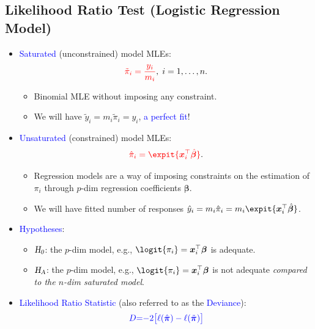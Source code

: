 \documentclass{article}\usepackage[]{graphicx}\usepackage[svgnames]{xcolor}
\newcommand{\HN}{\textsl{H}_{\textsl{0}}}%
\newcommand{\HA}{\textsl{H}_{\textsl{A}}}%
\providecommand{\Vector}[1]{\bm{#1}}%
\begin{document}
\subsection*{Likelihood Ratio Test (Logistic Regression Model)}
\begin{itemize}
      \item \textcolor{Blue}{Saturated} (unconstrained) model MLEs:
            \[ \textcolor{Red}{\tilde{\pi}_i=\frac{y_i}{m_i}},\; i=1,\ldots,n. \]
            \begin{itemize}
                  \item Binomial MLE without imposing any constraint.
                  \item We will have $ \tilde{y}_i=m_i\tilde{\pi}_i=y_i $, \textcolor{Blue}{a perfect fit}!
            \end{itemize}
      \item \textcolor{Blue}{Unsaturated} (constrained) model MLEs:
            \[ \textcolor{Red}{\hat{\pi}_i=\expit{\Vector{x}_i^\top \hat{\Vector{\beta}}}}. \]
            \begin{itemize}
                  \item Regression models are a way of imposing constraints on the estimation of $ \pi_i $ through $ p $-dim regression coefficients $ \Vector{\beta} $.
                  \item We will have fitted number of responses $ \hat{y}_i=m_i\hat{\pi}_i=m_i\expit{\Vector{x}_i^\top \hat{\Vector{\beta}}} $.
            \end{itemize}
      \item \textcolor{Blue}{Hypotheses}:
            \begin{itemize}
                  \item $ \HN $: the $ p $-dim model, e.g., $ \logit{\pi_i}=\Vector{x}_i^\top \Vector{\beta} $ is adequate.
                  \item $ \HA $: the $ p $-dim model, e.g., $ \logit{\pi_i}=\Vector{x}_i^\top \Vector{\beta} $ is not adequate \emph{compared
                              to the $ n $-dim saturated model}.
            \end{itemize}
      \item \textcolor{Blue}{Likelihood Ratio Statistic} (also referred to as the \textcolor{Blue}{Deviance}):
            \begin{align*}
                  \textcolor{Blue}{D}
                   & \textcolor{Blue}{=}\textcolor{Blue}{-2\bigl[\ell(\hat{\Vector{\pi}})-\ell(\tilde{\Vector{\pi}})\bigr]}                     \\

\end{align*}
\end{itemize}
\end{document}
